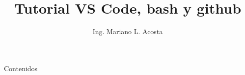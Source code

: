 \documentclass{beamer}
\title{Tutorial VS Code, bash y github}
\author{Ing. Mariano L. Acosta}
\institute[VFU]{Coderhouse}
\begin{document}
\begin{frame}[plain]
    \maketitle
\end{frame}


\begin{frame}{Contenidos}
\end{frame}
\end{document}
